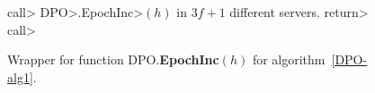 \begin{figure}[ht]
	\begin{algorithm}[H]
          \caption{\small Wrapper for function DPO.\textbf{EpochInc}$(h)$ for algorithm~\ref{DPO-alg1}.}
          \label{DPO-wEpochInc1}
          \begin{algorithmic}[1]
			\State \<call> \<DPO>.\<EpochInc>\((h)\) in \(3f+1\) different servers.
			\State \<return> \<call>
			\EndFunction
		\end{algorithmic}
	\end{algorithm}\vspace{-2em}
\end{figure}
